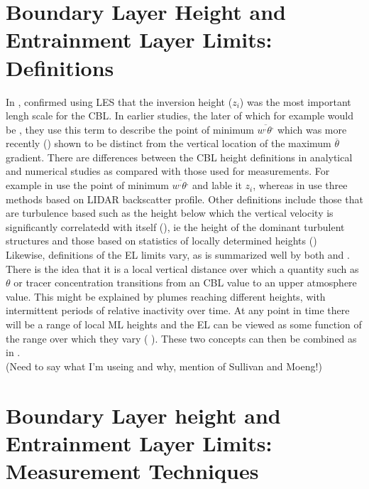 \section{Boundary Layer Height and Entrainment Layer Limits: Definitions}
\label{sec:BLhdeltah}
In \cite{Deardorff72}, \citeauthor{Deardorff72} confirmed using \acs{LES} that the inversion height ($z_{i}$) was the most important
lengh scale for the \acs{CBL}.  In earlier studies, the later of which for example would be \cite{SchmidtSchu}, they use this
term to describe the point of minimum $\overline{w^{,}\theta^{,}}$ which was more recently (\cite{SullMoengStev}) shown to be 
distinct from the vertical location of the maximum $\overline{\theta}$ gradient.   There are differences between the \acs{CBL}
height definitions in analytical and numerical studies as compared with those used for measurements.  For example \citeauthor{FedConzMir04}
in \cite{FedConzMir04} use the point of minimum $\overline{w^{,}\theta^{,}}$ and lable it $z_{i}$, whereas \citeauthor{Traum11} in \cite{Traum11}
use three methods based on LIDAR backscatter profile.  Other definitions include those that are turbulence based such as the height below which
the vertical velocity is significantly correlatedd with itself (\cite{Traum11}), ie the height of the dominant turbulent structures
and those based on statistics of locally determined heights (\cite{BrooksFowler2})\\

Likewise, definitions of the \acs{EL} limits vary, as is summarized well by both \cite{BrooksFowler2} and \cite{Traum11}.  There is the idea that
it is a local vertical distance over which a quantity such as $\theta$ or tracer concentration transitions from an \acs{CBL} value to an upper atmosphere
value.  This might be explained by plumes reaching different heights, with intermittent periods of relative inactivity over time.  At any point in time
there will be a range of local \acs{ML} heights and the \acs{EL} can be viewed as some function of the range over which they vary (\cite{StullNelEl} ).
These two concepts can then be combined as in \cite{BrooksFowler1}.\\     

(Need to say what I'm useing and why, mention of Sullivan and Moeng!)
\section{Boundary Layer height and Entrainment Layer Limits: Measurement Techniques}
\label{sec:BLMeas}

